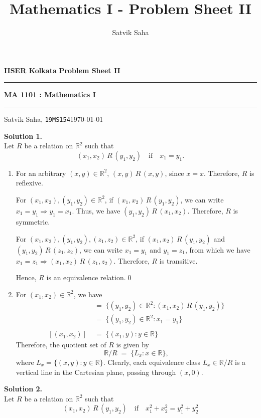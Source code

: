\documentclass[10pt]{article}
\title{Mathematics I - Problem Sheet II}
\author{Satvik Saha}
\date{}
\begin{document}
        \par\textbf{IISER Kolkata} \hfill \textbf{Problem Sheet II}
        \vspace{3pt}
        \hrule
        \vspace{3pt}
        \begin{center}
                \LARGE{\textbf{MA 1101 : Mathematics I}}
        \end{center}
        \vspace{3pt}
        \hrule
        \vspace{3pt}
        Satvik Saha, \texttt{19MS154}\hfill\today
        \vspace{20pt}

        \textbf{Solution 1.}\\
        Let $R$ be a relation on $\mathbb{R}^2$ such that
        \[(x_1, x_2)\,R\,(y_1, y_2) \quad\text{if}\quad x_1 = y_1.\]
        \begin{enumerate}
                \item For an arbitrary $(x, y)\in\mathbb{R}^2$, $(x, y)\,R\,(x, y)$, since $x = x$. Therefore, $R$ is reflexive.

                For $(x_1, x_2), (y_1, y_2) \in \mathbb{R}^2$, if $(x_1, x_2)\,R\,(y_1, y_2)$, we can write $x_1 = y_1 \Rightarrow y_1 = x_1$.
                Thus, we have $(y_1, y_2)\,R\,(x_1, x_2)$. Therefore, $R$ is symmetric.

                For $(x_1, x_2), (y_1, y_2), (z_1, z_2) \in \mathbb{R}^2$, if $(x_1, x_2)\,R\,(y_1, y_2)$ and $(y_1, y_2)\,R\,(z_1, z_2)$,
                we can write $x_1 = y_1$ and $y_1 = z_1$, from which we have $x_1 = z_1 \Rightarrow (x_1, x_2)\,R\,(z_1, z_2)$.
                Therefore, $R$ is transitive.

                Hence, $R$ is an equivalence relation.\qed

                \item For $(x_1, x_2) \in \mathbb{R}^2$, we have
                \begin{align*}
                [(x_1, x_2)] \;&=\; \{(y_1, y_2) \in \mathbb{R}^2 : (x_1, x_2)\,R\,(y_1, y_2)\} \\
                        \;&=\; \{(y_1, y_2) \in \mathbb{R}^2 : x_1 = y_1\}\\\\
                [(x_1, x_2)] \;&=\; \{(x_1, y) : y \in \mathbb{R}\}
                \end{align*}
                Therefore, the quotient set of $R$ is given by $$\mathbb{R}/R \;=\; \{L_x : x \in \mathbb{R}\},$$
                where $L_x = \{(x, y) : y \in \mathbb{R}\}$.
                Clearly, each equivalence class $L_x \in \mathbb{R}/R$ is a vertical line in the Cartesian plane, passing through $(x, 0)$.
        \end{enumerate}

        \textbf{Solution 2.}\\
        Let $R$ be a relation on $\mathbb{R}^2$ such that
        \[(x_1, x_2)\,R\,(y_1, y_2) \quad\text{if}\quad x_1^2 + x_2^2 = y_1^2 + y_2^2\]
\end{document}
